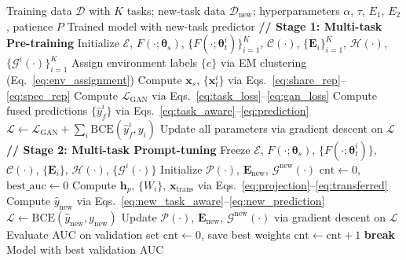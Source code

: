 \documentclass[review,anonymous]{acmart}
\begin{document}
\begin{algorithm}[t]
  \caption{MPT-Rec Two-Stage Training}
  \label{alg:mptrec}
  \begin{algorithmic}[1]
    \REQUIRE Training data $\mathcal{D}$ with $K$ tasks; new-task data
             $\mathcal{D}_{\text{new}}$; hyperparameters $\alpha$, $\tau$,
             $E_1$, $E_2$, patience $P$
    \ENSURE Trained model with new-task predictor
    \medskip
    \STATE \textbf{// Stage 1: Multi-task Pre-training}
    \STATE Initialize $\mathcal{E}$, $F(\cdot;\boldsymbol{\theta}_s)$,
           $\{F(\cdot;\boldsymbol{\theta}_t^i)\}_{i=1}^K$,
           $\mathcal{C}(\cdot)$, $\{\mathbf{E}_i\}_{i=1}^K$,
           $\mathcal{H}(\cdot)$, $\{\mathcal{G}^i(\cdot)\}_{i=1}^K$
      \STATE Assign environment labels $\{e\}$ via EM clustering
            (Eq.~\ref{eq:env_assignment})
        \STATE Compute $\mathbf{x}_s$, $\{\mathbf{x}_t^i\}$ via
                 Eqs.~\eqref{eq:share_rep}--\eqref{eq:spec_rep}
        \STATE Compute $\mathcal{L}_{\text{GAN}}$ via Eqs.~\eqref{eq:task_loss}--\eqref{eq:gan_loss}
        \STATE Compute fused predictions $\{\hat{y}_f^i\}$ via
                 Eqs.~\eqref{eq:task_aware}--\eqref{eq:prediction}
        \STATE $\mathcal{L} \leftarrow \mathcal{L}_{\text{GAN}} +
                \sum_i \text{BCE}(\hat{y}_f^i, y_i)$
        \STATE Update all parameters via gradient descent on $\mathcal{L}$
      \ENDFOR
    \ENDFOR
    \medskip
    \STATE \textbf{// Stage 2: Multi-task Prompt-tuning}
    \STATE Freeze $\mathcal{E}$, $F(\cdot;\boldsymbol{\theta}_s)$,
           $\{F(\cdot;\boldsymbol{\theta}_t^i)\}$, $\mathcal{C}(\cdot)$,
           $\{\mathbf{E}_i\}$, $\mathcal{H}(\cdot)$, $\{\mathcal{G}^i(\cdot)\}$
    \STATE Initialize $\mathcal{P}(\cdot)$, $\mathbf{E}_{\text{new}}$,
           $\mathcal{G}^{\text{new}}(\cdot)$
    \STATE $\text{cnt} \leftarrow 0$, $\text{best\_auc} \leftarrow 0$
        \STATE Compute $\mathbf{h}_p$, $\{W_i\}$, $\mathbf{x}_{\text{trans}}$
                 via Eqs.~\eqref{eq:projection}--\eqref{eq:transferred}
        \STATE Compute $\hat{y}_{\text{new}}$ via
                 Eqs.~\eqref{eq:new_task_aware}--\eqref{eq:new_prediction}
        \STATE $\mathcal{L} \leftarrow \text{BCE}(\hat{y}_{\text{new}}, y_{\text{new}})$
        \STATE Update $\mathcal{P}(\cdot)$, $\mathbf{E}_{\text{new}}$,
                 $\mathcal{G}^{\text{new}}(\cdot)$ via gradient descent on $\mathcal{L}$
      \ENDFOR
      \STATE Evaluate AUC on validation set
       \STATE $\text{cnt} \leftarrow 0$,
           save best weights
      \ELSE \STATE $\text{cnt} \leftarrow \text{cnt} + 1$
      \ENDIF
       \STATE \textbf{break} \ENDIF
    \ENDFOR
    \STATE \RETURN Model with best validation AUC
  \end{algorithmic}
\end{algorithm}
\end{document}
